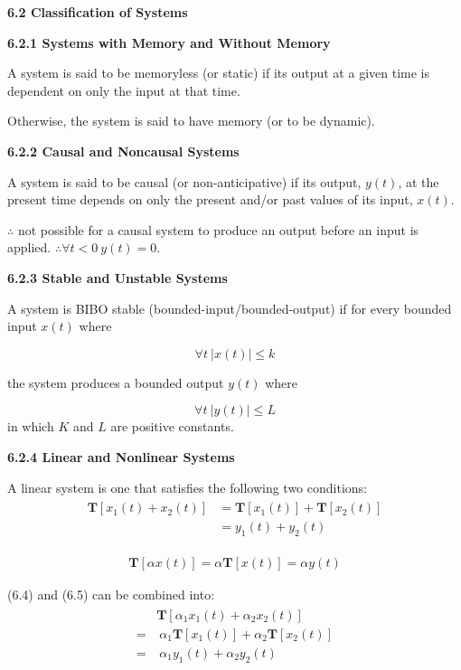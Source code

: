 \documentclass[landscape,a4paper]{extarticle}
\newcommand{\T}{\textbf{T}}
\begin{document}
\begin{multicols*}{5}
    \textbf{6.2 Classification of Systems}

    \textbf{6.2.1 Systems with Memory and Without Memory}

    A system is said to be memoryless (or static) if its output at a given time is dependent on only the input at that time.

    Otherwise, the system is said to have memory (or to be dynamic).

    \textbf{6.2.2 Causal and Noncausal Systems}

    A system is said to be causal (or non-anticipative) if its output, $y(t)$, at the present time depends on only the present and/or past values of its input, $x(t)$.

    $\therefore$ not possible for a causal system to produce an output before an input is applied. $\therefore \forall t < 0\ y(t)=0$.

    \textbf{6.2.3 Stable and Unstable Systems}

    A system is BIBO stable (bounded-input/bounded-output) if for every bounded input $x(t)$ where

    \[
        \forall t\ |x(t)| \leq k \tag{6.2}
    \]

    the system produces a bounded output $y(t)$ where 

    \[
        \forall t\ |y(t)| \leq L \tag{6.3}
    \]
    in which $K$ and $L$ are positive constants.

    \textbf{6.2.4 Linear and Nonlinear Systems}

    A linear system is one that satisfies the following two conditions:
    \begin{align*}
        \begin{split}
            \T\left[x_1(t) + x_2(t)\right] &= \T[x_1(t)] + \T[x_2(t)]\\
            &= y_1(t) + y_2(t)
        \end{split} \tag{6.4}
    \end{align*}

    \begin{align*}
        \T[\alpha x(t)] = \alpha \T[x(t)] = \alpha y(t) \tag{6.5}
    \end{align*}

    (6.4) and (6.5) can be combined into:
    \begin{align}
        \begin{split}
            &\T[\alpha_1x_1(t) + \alpha_2x_2(t)]\\
            =&\ \alpha_1\T[x_1(t)] + \alpha_2\T[x_2(t)]\\
            =&\ \alpha_1y_1(t) + \alpha_2y_2(t)
        \end{split} \tag{6.6}
    \end{align}


\end{multicols*}
\end{document}
